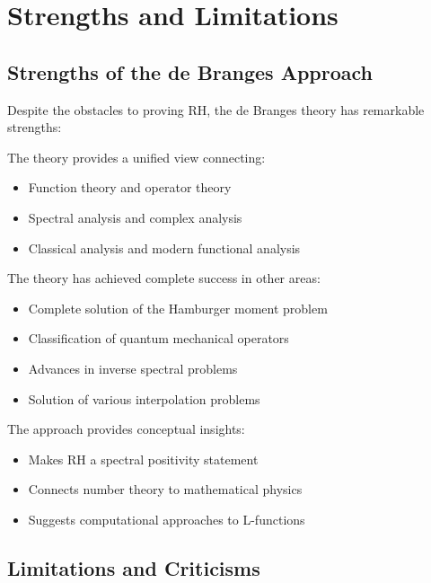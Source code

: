\section{Strengths and Limitations}
\label{sec:strengths-limitations}

\subsection{Strengths of the de Branges Approach}

Despite the obstacles to proving RH, the de Branges theory has remarkable strengths:

\begin{strength}
The theory provides a unified view connecting:
\begin{itemize}
\item Function theory and operator theory
\item Spectral analysis and complex analysis  
\item Classical analysis and modern functional analysis
\end{itemize}
\end{strength}

\begin{strength}
The theory has achieved complete success in other areas:
\begin{itemize}
\item Complete solution of the Hamburger moment problem \cite{debranges1968}
\item Classification of quantum mechanical operators
\item Advances in inverse spectral problems
\item Solution of various interpolation problems
\end{itemize}
\end{strength}

\begin{strength}
The approach provides conceptual insights:
\begin{itemize}
\item Makes RH a spectral positivity statement
\item Connects number theory to mathematical physics
\item Suggests computational approaches to L-functions
\end{itemize}
\end{strength}

\subsection{Limitations and Criticisms}

